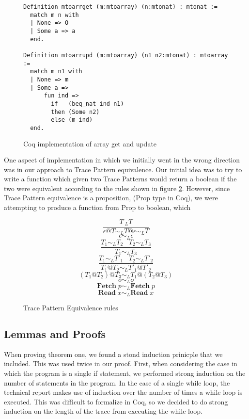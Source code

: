 \documentclass[10pt,  onecolumn]{article}
\begin{document}
\begin{figure}
\caption{ Coq implementation of array get and update}
\label{fig:coq_arrays}

\begin{lstlisting}
Definition mtoarrget (m:mtoarray) (n:mtonat) : mtonat :=
  match m n with
  | None => O
  | Some a => a
  end.

Definition mtoarrupd (m:mtoarray) (n1 n2:mtonat) : mtoarray :=
  match m n1 with
  | None => m
  | Some a =>
      fun ind =>
        if   (beq_nat ind n1)
        then (Some n2)
        else (m ind)
  end.
\end{lstlisting}

\end{figure}


One aspect of implementation in which we initially went in the wrong direction was in our approach to Trace Pattern equivalence.
Our initial idea was to try to write a function which given two Trace Patterns would return a boolean if the two were equivalent according to the rules shown in figure \ref{fig:mto_TracePat_equiv}.
However, since Trace Pattern equivalence is a proposition, (Prop type in Coq), we were attempting to produce a function from Prop to boolean, which 


\begin{figure}
\caption{Trace Pattern Equivalence rules}
\label{fig:mto_TracePat_equiv}
\[
\frac {T ~_L T}
        {\epsilon @T  \sim_{L}T@\epsilon  \sim_{L} T}
\]
\[
\epsilon \sim_{L}  \epsilon
\]
\[
\frac {T_1 \sim_L T_2 \;\;\; T_2 \sim_L T_3}
        {T_1 \sim_L T_3}
\]
\[
\frac {T_1 \sim_L T'_1 \;\;\; T_2 \sim_L T'_2}
        {T_1@T_2 \sim_L T'_1@T'_2}
\]
\[
(T_1@T_2)@T_3 \sim_L T_1@(T_2@T_3)
\]
\[
o \sim_L o
\]
\[
\textbf{Fetch}\;p \sim_L \textbf{Fetch}\;p
\]
\[
\textbf{Read}\;x \sim_L \textbf{Read}\;x
\]


\end{figure}










\subsection{ Lemmas and Proofs }

When proving theorem one, we found a stond induction prinicple that we included. \cite{strongind}
This was used twice in our proof. First, when considering the case in which the program is a single if statement, we performed strong induction on the number of statements in the program. In the case of a single while loop, the technical report makes use of induction over the number of times a while loop is executed. This was difficult to formalize in Coq, so we decided to do strong induction on the length of the trace from executing the while loop.
\end{document}
